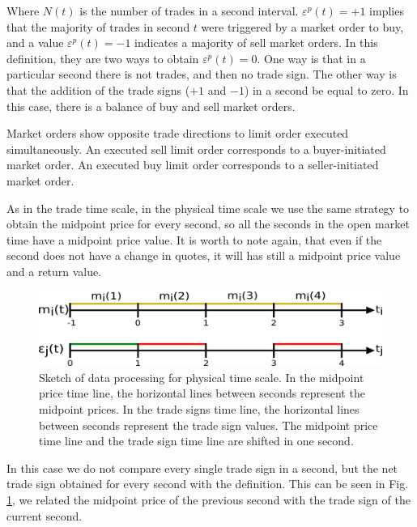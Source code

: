 Where $N \left(t \right)$ is the number of trades in a second interval.
$\varepsilon^{p}\left( t \right) = +1$ implies that the majority of
trades in second $t$ were triggered by a market order to buy, and a value
$\varepsilon^{p}\left( t \right) = -1$ indicates a majority of sell
market orders. In this definition, they are two ways to obtain
$\varepsilon^{p}\left( t \right) = 0$. One way is that in a particular
second there is not trades, and then no trade sign. The other  way is that the
addition of the trade signs ($+1$ and $-1$) in a second be equal to zero. In
this case, there is a balance of buy and sell market orders.

Market orders show opposite trade directions to limit order executed
simultaneously. An executed sell limit order corresponds to a buyer-initiated
market order. An executed buy limit order corresponds to a seller-initiated
market order.

As in the trade time scale, in the physical time scale we use the same strategy
to obtain the midpoint price for every second, so all the seconds in the open
market time have a midpoint price value. It is worth to note again, that even
if the second does not have a change in quotes, it will has still a midpoint
price value and a return value.

\begin{figure}[htbp]
    \centering
    \includegraphics[width=\columnwidth]
    {figures/02_relation_trades_quotes_time_scale.png}
    \caption{Sketch of data processing for physical time scale. In the midpoint
             price time line, the horizontal lines between seconds represent
             the midpoint prices. In the trade signs time line, the horizontal
             lines between seconds represent the trade sign values. The
             midpoint price time line and the trade sign time line are shifted
             in one second.}
    \label{fig:relation_trades_midpoint_time_scale}
\end{figure}

In this case we do not compare every single trade sign in a second, but the net
trade sign obtained for every second with the definition. This can be seen in
Fig. \ref{fig:relation_trades_midpoint_time_scale}, we related the midpoint
price of the previous second with the trade sign of the current second.

